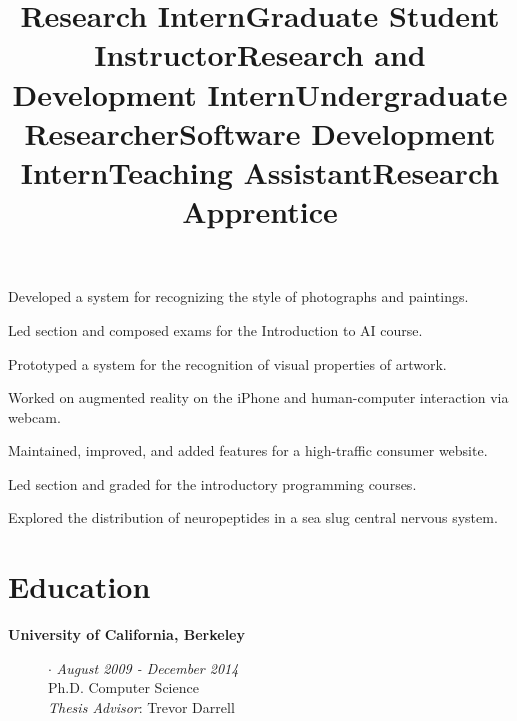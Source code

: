 \documentclass[line, margin]{res}
\begin{document}
\begin{resume}
\title{\bf Research Intern}
\begin{position}
Developed a system for recognizing the style of photographs and paintings.
\end{position}

\title{\bf Graduate Student Instructor}
\begin{position}
Led section and composed exams for the Introduction to AI course.
\end{position}

\title{\bf Research and Development Intern}
\begin{position}
Prototyped a system for the recognition of visual properties of artwork.
\end{position}

\title{\bf Undergraduate Researcher}
\begin{position}
Worked on augmented reality on the iPhone and human-computer interaction via webcam.
\end{position}

\title{\bf Software Development Intern}
\begin{position}
Maintained, improved, and added features for a high-traffic consumer website.
\end{position}

\title{\bf Teaching Assistant}
\begin{position}
Led section and graded for the introductory programming courses.
\end{position}

\title{\bf Research Apprentice}
\begin{position}
Explored the distribution of neuropeptides in a sea slug central nervous system.
\end{position}

\section{\sc Education}
\begin{description}
\item[{\bf University of California, Berkeley}] $\cdot$ {\it August 2009 - December 2014}
\\Ph.D. Computer Science
\\\emph{Thesis Advisor}: Trevor Darrell


\end{description}
\end{resume}
\end{document}
